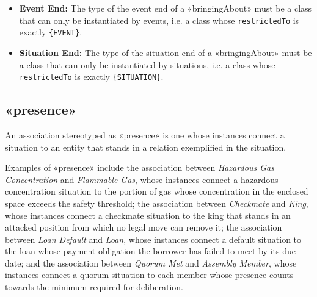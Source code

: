 \begin{itemize}
    \item \textbf{Event End:} The type of the event end of a «bringingAbout» must be a class that can only be instantiated by events, i.e. a class whose \texttt{restrictedTo} is exactly \texttt{\{EVENT\}}.
    \item \textbf{Situation End:} The type of the situation end of a «bringingAbout» must be a class that can only be instantiated by situations, i.e. a class whose \texttt{restrictedTo} is exactly \texttt{\{SITUATION\}}.
\end{itemize}






\subsection{«presence»}
\label{stereotype:presence}


An association stereotyped as «presence» is one whose instances connect a situation to an entity that stands in a relation exemplified in the situation.

Examples of «presence» include the association between \textit{Hazardous Gas Concentration} and \textit{Flammable Gas}, whose instances connect a hazardous concentration situation to the portion of gas whose concentration in the enclosed space exceeds the safety threshold; the association between \textit{Checkmate} and \textit{King}, whose instances connect a checkmate situation to the king that stands in an attacked position from which no legal move can remove it; the association between \textit{Loan Default} and \textit{Loan}, whose instances connect a default situation to the loan whose payment obligation the borrower has failed to meet by its due date; and the association between \textit{Quorum Met} and \textit{Assembly Member}, whose instances connect a quorum situation to each member whose presence counts towards the minimum required for deliberation.

